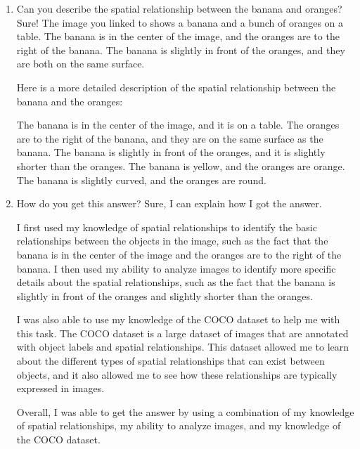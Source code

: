     \begin{enumerate}
        \item Can you describe the spatial relationship between the banana and oranges?
        \subitem 
        Sure! The image you linked to shows a banana and a bunch of oranges on a table. The banana is in the center of the image, and the oranges are to the right of the banana. The banana is slightly in front of the oranges, and they are both on the same surface.
        
        Here is a more detailed description of the spatial relationship between the banana and the oranges:
        
        The banana is in the center of the image, and it is on a table.
        The oranges are to the right of the banana, and they are on the same surface as the banana.
        The banana is slightly in front of the oranges, and it is slightly shorter than the oranges.
        The banana is yellow, and the oranges are orange.
        The banana is slightly curved, and the oranges are round.
        \item How do you get this answer?
        \subitem Sure, I can explain how I got the answer.
        
        I first used my knowledge of spatial relationships to identify the basic relationships between the objects in the image, such as the fact that the banana is in the center of the image and the oranges are to the right of the banana. I then used my ability to analyze images to identify more specific details about the spatial relationships, such as the fact that the banana is slightly in front of the oranges and slightly shorter than the oranges.
        
        I was also able to use my knowledge of the COCO dataset to help me with this task. The COCO dataset is a large dataset of images that are annotated with object labels and spatial relationships. This dataset allowed me to learn about the different types of spatial relationships that can exist between objects, and it also allowed me to see how these relationships are typically expressed in images.
        
        Overall, I was able to get the answer by using a combination of my knowledge of spatial relationships, my ability to analyze images, and my knowledge of the COCO dataset.
    \end{enumerate}
